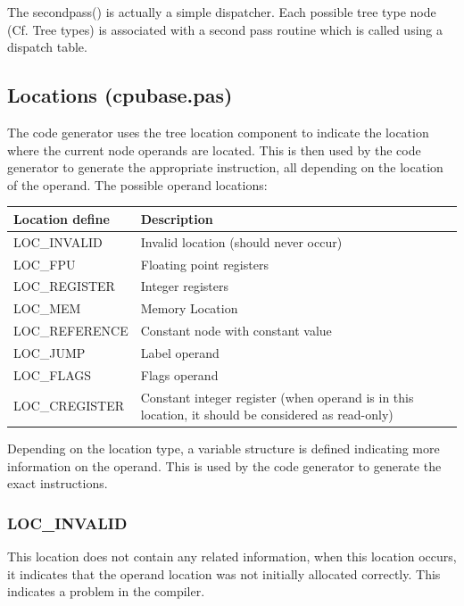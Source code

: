 \documentclass [a4paper,12pt]{article}
\begin{document}
The \textsf{secondpass()} is actually a simple dispatcher. Each possible
tree type node (Cf. Tree types) is associated with
a second pass routine which is called using a dispatch table.

\subsection{Locations (cpubase.pas)}
\label{subsec:locations}

The code generator uses the tree location component to indicate the location
where the current node operands are located. This is then used by the code
generator to generate the appropriate instruction, all depending on the
location of the operand. The possible operand locations:

\begin{longtable}{|l|p{10cm}|}
\hline
Location define & Description \\
\hline
\endhead
\hline
\endfoot
\textsf{LOC{\_}INVALID}&
    Invalid location (should never occur) \\
\textsf{LOC{\_}FPU}&
    Floating point registers \\
\textsf{LOC{\_}REGISTER}&
    Integer registers \\
\textsf{LOC{\_}MEM}&
    Memory Location \\
\textsf{LOC{\_}REFERENCE}&
    Constant node with constant value \\
\textsf{LOC{\_}JUMP}&
    Label operand \\
\textsf{LOC{\_}FLAGS}&
    Flags operand \\
\textsf{LOC{\_}CREGISTER}&
    Constant integer register (when operand is in this
    location, it should be considered as read-only) \\
\end{longtable}

Depending on the location type, a variable structure is defined indicating
more information on the operand. This is used by the code generator to
generate the exact instructions.

\subsubsection{LOC{\_}INVALID}
\label{subsubsec:mylabel18}

This location does not contain any related information, when this location
occurs, it indicates that the operand location was not initially allocated
correctly. This indicates a problem in the compiler.
\end{document}
